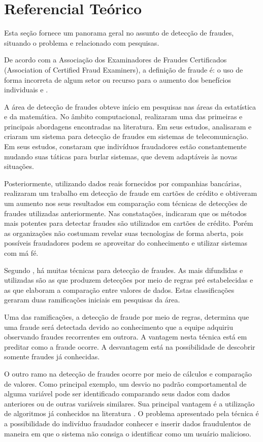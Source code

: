 \documentclass[smallextended]{svjour3}
\begin{document}
\section{Referencial Teórico}
\label{sec:2}

Esta seção fornece um panorama geral no assunto de detecção de fraudes, situando o problema e relacionado com pesquisas.

De acordo com a Associação dos Examinadores de Fraudes Certificados (Association of Certified Fraud Examiners), a definição de fraude é: o uso de forma incorreta de algum setor ou recurso para o aumento dos benefícios individuais \citep{Abdallah2016} e \citep{Allan2010}.

A área de detecção de fraudes obteve início em pesquisas nas áreas da estatística e da matemática. No âmbito computacional, \cite{Fawcett1997} realizaram uma das primeiras e principais abordagens encontradas na literatura. Em seus estudos, analisaram e criaram um sistema para detecção de fraudes em sistemas de telecomunicação. Em seus estudos, constaram que indivíduos fraudadores estão constantemente mudando suas táticas para burlar sistemas, que devem adaptáveis às novas situações.

Posteriormente, utilizando dados reais fornecidos por companhias bancárias, \cite{809570} realizaram um trabalho em detecção de fraude em cartões de crédito e obtiveram um aumento nos seus resultados em comparação com técnicas de detecções de fraudes utilizadas anteriormente. Nas constatações, indicaram que os métodos mais potentes para detectar fraudes são utilizados em cartões de crédito. Porém as organizações não costumam revelar suas tecnologias de forma aberta, pois possíveis fraudadores podem se aproveitar do conhecimento e utilizar sistemas com má fé.

Segundo \cite{Fawcett1997}, há muitas técnicas para detecção de fraudes. As mais difundidas e utilizadas são as que produzem detecções por meio de regras pré estabelecidas e as que elaboram a comparação entre valores de dados. Estas classificações geraram duas ramificações iniciais em pesquisas da área.

Uma das ramificações, a detecção de fraude por meio de regras, determina que uma fraude será detectada devido ao conhecimento que a equipe adquiriu observando fraudes recorrentes em outrora. A vantagem nesta técnica está em preditar como a fraude ocorre. A desvantagem está na possibilidade de descobrir somente fraudes já conhecidas.

O outro ramo na detecção de fraudes ocorre por meio de cálculos e comparação de valores. Como principal exemplo, um desvio no padrão comportamental de alguma variável pode ser identificado comparando seus dados com dados anteriores ou de outras variáveis similares. Sua principal vantagem é a utilização de algoritmos já conhecidos na literatura \citep{Fawcett1997}. O problema apresentado pela técnica é a possibilidade do indivíduo fraudador conhecer e inserir dados fraudulentos de maneira em que o sistema não consiga o identificar como um usuário malicioso.
\end{document}
